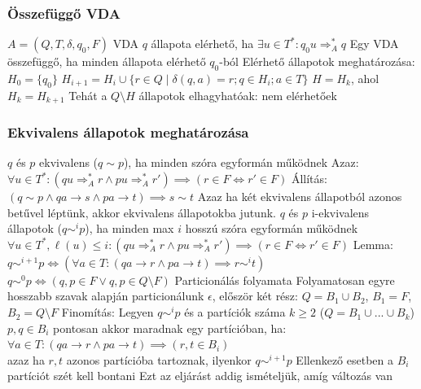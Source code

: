 \documentclass[12pt,a4paper]{article}
\newcommand{\atos}{\Rightarrow_A^*}
\begin{document}
\subsubsection{Összefüggő VDA}

\begin{outline}
	\1 $A=(Q,T,\delta,q_0,F)$ VDA $q$ állapota elérhető, ha $\exists u \in T^*: q_0 u \atos q$
	\1 Egy VDA összefüggő, ha minden állapota elérhető $q_0$-ból
	\1 Elérhető állapotok meghatározása:
		\2 $H_0 = \{q_0\}$
		\2 $H_{i+1} = H_i \cup \{r \in Q \;|\; \delta(q,a) = r; q \in H_i; a \in T\}$
		\2 $H=H_k$, ahol $H_k = H_{k+1}$
	\1 Tehát a $Q \setminus H$ állapotok elhagyhatóak: nem elérhetőek
\end{outline}

\pagebreak

\subsubsection{Ekvivalens állapotok meghatározása}

\begin{outline}
	\1 $q$ és $p$ ekvivalens ($q \sim p$), ha minden szóra egyformán működnek
		\2 Azaz: $\forall u \in T^*: (qu \atos r \wedge pu \atos r') \implies (r \in F \Leftrightarrow r' \in F)$
	\1 Állítás: $(q \sim p \wedge qa \to s \wedge pa \to t) \implies s \sim t$
		\2 Azaz ha két ekvivalens állapotból azonos betűvel léptünk, akkor ekvivalens állapotokba jutunk.
	\1 $q$ és $p$ i-ekvivalens állapotok ($q \sim^i p$), ha minden max $i$ hosszú szóra egyformán működnek
		\2 $\forall u \in T^*, \ell(u) \le i: (qu \atos r \wedge pu \atos r') \implies (r \in F \Leftrightarrow r' \in F)$
		\2 Lemma: $q \sim^{i+1} p \Leftrightarrow (\forall a \in T: (qa \to r \wedge pa \to t) \implies r \sim^i t)$
		\2 $q \sim^0 p \Leftrightarrow (q,p \in F \lor q,p \in Q \setminus F)$
	\1 Particionálás folyamata
		\2 Folyamatosan egyre hosszabb szavak alapján particionálunk
		\2 $\epsilon$, először két rész: $Q = B_1 \cup B_2$, $B_1 = F$, $B_2 = Q \setminus F$
		\2 Finomítás:
			\3 Legyen $q \sim^i p$ és a partíciók száma $k \ge 2$ ($Q = B_1 \cup ... \cup B_k$)
			\3 $p,q \in B_i$ pontosan akkor maradnak egy partícióban, ha:\\
			$\forall a \in T: (qa \to r \wedge pa \to t) \implies (r,t \in B_i)$\\
			azaz ha $r,t$ azonos partícióba tartoznak, ilyenkor $q \sim^{i+1} p$
			\3 Ellenkező esetben a $B_i$ partíciót szét kell bontani
			\3 Ezt az eljárást addig ismételjük, amíg változás van
\end{outline}
\end{document}
